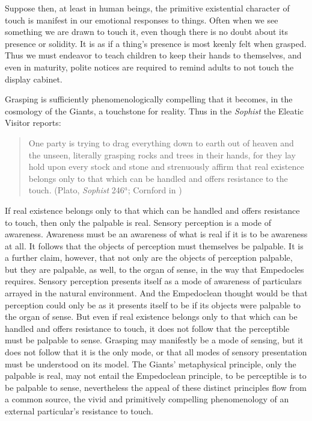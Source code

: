Suppose then, at least in human beings, the primitive existential character of touch is manifest in our emotional responses to things. Often when we see something we are drawn to touch it, even though there is no doubt about its presence or solidity. It is as if a thing's presence is most keenly felt when grasped. Thus we must endeavor to teach children to keep their hands to themselves, and even in maturity, polite notices are required to remind adults to not touch the display cabinet.

Grasping is sufficiently phenomenologically compelling that it becomes, in the cosmology of the Giants, a touchstone for reality. Thus in the \emph{Sophist} the Eleatic Visitor reports:
\begin{quote}
    One party is trying to drag everything down to earth out of heaven and the unseen, literally grasping rocks and trees in their hands, for they lay hold upon every stock and stone and strenuously affirm that real existence belongs only to that which can be handled and offers resistance to the touch. (Plato, \emph{Sophist} 246\( ^{a} \); Cornford in \citealt[990]{Hamilton:1989fk})
\end{quote}
If real existence belongs only to that which can be handled and offers resistance to touch, then only the palpable is real. Sensory perception is a mode of awareness. Awareness must be an awareness of what is real if it is to be awareness at all. It follows that the objects of perception must themselves be palpable. It is a further claim, however, that not only are the objects of perception palpable, but they are palpable, as well, to the organ of sense, in the way that Empedocles requires. Sensory perception presents itself as a mode of awareness of particulars arrayed in the natural environment. And the Empedoclean thought would be that perception could only be as it presents itself to be if its objects were palpable to the organ of sense. But even if real existence belongs only to that which can be handled and offers resistance to touch, it does not follow that the perceptible must be palpable to sense. Grasping may manifestly be a mode of sensing, but it does not follow that it is the only mode, or that all modes of sensory presentation must be understood on its model. The Giants' metaphysical principle, only the palpable is real, may not entail the Empedoclean principle, to be perceptible is to be palpable to sense, nevertheless the appeal of these distinct principles flow from a common source, the vivid and primitively compelling phenomenology of an external particular's resistance to touch.


